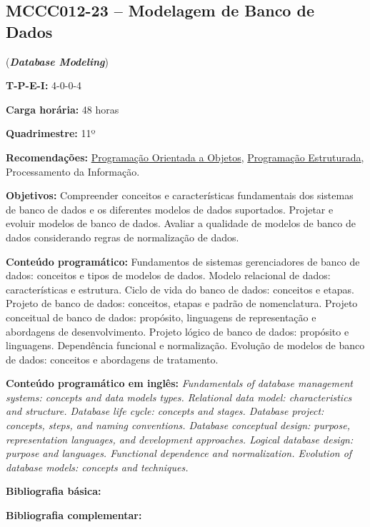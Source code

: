 \documentclass[12pt,a4paper]{article}
\begin{document}
\subsection*{MCCC012-23 -- Modelagem de Banco de Dados}
\label{disc:mbd}

(\textbf{\textit{Database Modeling}})

\begin{center}
\begin{minipage}{0.85\textwidth}
    
    \textbf{T-P-E-I:} 4-0-0-4

    \textbf{Carga horária:} 48 horas
    
    \textbf{Quadrimestre:} 11º 
    
    \textbf{Recomendações:} 
    \hyperref[disc:poo]{Programação Orientada a Objetos},
    \hyperref[disc:pe]{Programação Estruturada},
    Processamento da Informação.
    
\end{minipage}
\end{center}

\textbf{Objetivos:}
Compreender conceitos e características fundamentais dos sistemas de banco de
dados e os diferentes modelos de dados suportados. 
Projetar e evoluir modelos de banco de dados. 
Avaliar a qualidade de modelos de banco de dados considerando regras de
normalização de dados.

\textbf{Conteúdo programático:}
Fundamentos de sistemas gerenciadores de banco de dados: conceitos e tipos de modelos de dados.
Modelo relacional de dados: características e estrutura.  
Ciclo de vida do banco de dados: conceitos e etapas. 
Projeto de banco de dados: conceitos, etapas e padrão de nomenclatura. 
Projeto conceitual de banco de dados: propósito, linguagens de representação e abordagens de desenvolvimento. 
Projeto lógico de banco de dados: propósito e linguagens. 
Dependência funcional e normalização. 
Evolução de modelos de banco de dados: conceitos e abordagens de tratamento.

\textbf{Conteúdo programático em inglês:}
\textit{Fundamentals of database management systems: concepts and data models types.
Relational data model: characteristics and structure.
Database life cycle: concepts and stages.
Database project: concepts, steps, and naming conventions.
Database conceptual design: purpose, representation languages, and development approaches.
Logical database design: purpose and languages.
Functional dependence and normalization.
Evolution of database models: concepts and techniques.}

\newrefsection
\textbf{Bibliografia básica:}
\nocite{2015-date, 2013-teory-etal, 2005-elmasri-navathe} 
\printbibliography

\newrefsection
\textbf{Bibliografia complementar:}
\nocite{2006-allen-terry, 2005-date, 2012-silberschatz-etal, 2011-coronel, 2008-halpin-morgan}
\printbibliography
\end{document}
